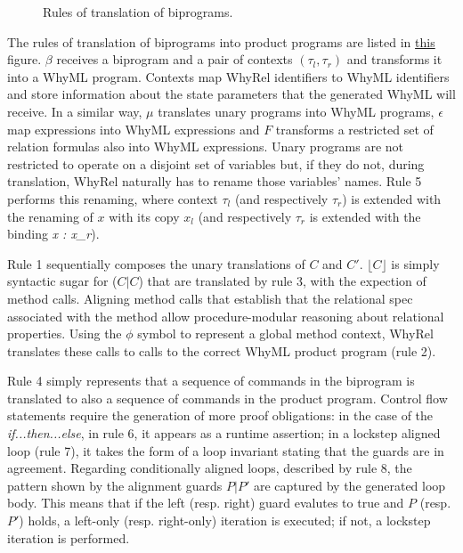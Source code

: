\begin{figure}[ht]
\begin{minipage}{\linewidth}
  \end{minipage}
  \caption{Rules of translation of biprograms.}
  \label{fig:translation-biprograms-rules}
\end{figure}

The rules of translation of biprograms into product programs are listed in \hyperref[fig:translation-biprograms-rules]{this} figure.
$\beta$ receives a biprogram and a pair of contexts $(\tau_l,\tau_r)$ and transforms it into a WhyML program.
Contexts map WhyRel identifiers to WhyML identifiers and store information about the state parameters that the generated WhyML will receive.
In a similar way, $\mu$ translates unary programs into WhyML programs, $\epsilon$ map expressions into WhyML expressions and $F$ transforms a restricted set of relation formulas also into WhyML expressions.
Unary programs are not restricted to operate on a disjoint set of variables but, if they do not, during translation, WhyRel naturally has to rename those variables' names. 
Rule 5 performs this renaming, where context $\tau_l$ (and respectively $\tau_r$) is extended with the renaming of $x$ with its copy $x_l$ (and respectively $\tau_r$ is extended with the binding \emph{x : x\_r}).

Rule 1 sequentially composes the unary translations of $C$ and $C'$.
$\lfloor C \rfloor$ is simply syntactic sugar for ($C|C$) that are translated by rule 3, with the expection of method calls.
Aligning method calls that establish that the relational spec associated with the method allow procedure-modular reasoning about relational properties.
Using the $\phi$ symbol to represent a global method context, WhyRel translates these calls to calls to the correct WhyML product program (rule 2).

Rule 4 simply represents that a sequence of commands in the biprogram is translated to also a sequence of commands in the product program.
Control flow statements require the generation of more proof obligations: in the case of the \emph{if...then...else}, in rule 6, it appears as a runtime assertion; in a lockstep aligned loop (rule 7), it takes the form of a loop invariant stating that the guards are in agreement.
Regarding conditionally aligned loops, described by rule 8, the pattern shown by the alignment guards $P | P'$ are captured by the generated loop body.
This means that if the left (resp. right) guard evalutes to true and $P$ (resp. $P'$) holds, a left-only (resp. right-only) iteration is executed; if not, a lockstep iteration is performed.

